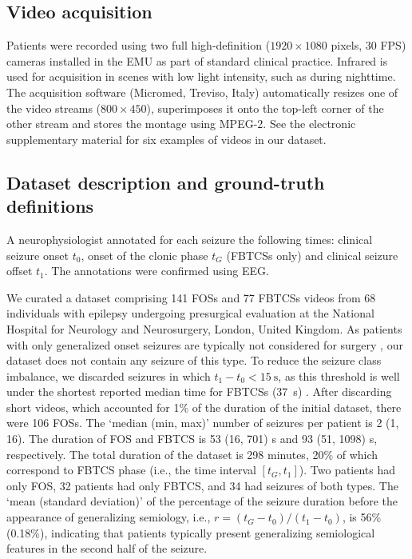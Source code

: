 \subsection{Video acquisition}

Patients were recorded using two full high-definition ($1920 \times 1080$ pixels, 30 \ac{FPS}) cameras installed in the \ac{EMU} as part of standard clinical practice.
Infrared is used for acquisition in scenes with low light intensity, such as during nighttime.
The acquisition software (Micromed, Treviso, Italy) automatically resizes one of the video streams ($800 \times 450$), superimposes it onto the top-left corner of the other stream and stores the montage using MPEG-2.
See the electronic supplementary material%
for six examples of videos in our dataset.


\subsection{Dataset description and ground-truth definitions}
\label{sec:dataset}

A neurophysiologist annotated for each seizure the following times: clinical seizure onset $t_0$, onset of the clonic phase $t_G$ (\acp{FBTCS} only) and clinical seizure offset $t_1$.
The annotations were confirmed using \ac{EEG}.

We curated a dataset comprising 141 \acp{FOS} and 77 \acp{FBTCS} videos from 68 individuals with epilepsy undergoing presurgical evaluation at the National Hospital for Neurology and Neurosurgery, London, United Kingdom.
As patients with only generalized onset seizures are typically not considered for surgery \cite{duncan_brain_2016}, our dataset does not contain any seizure of this type.  %
To reduce the seizure class imbalance, we discarded seizures in which $t_1 - t_0 < \SI{15}{\second}$, as this threshold is well under the shortest reported median time for \acp{FBTCS} (\SI{37}{\second}) \cite{jenssen_how_2006}.
After discarding short videos, which accounted for 1\% of the duration of the initial dataset, there were 106 \acp{FOS}.
The `median (min, max)' number of seizures per patient is 2 (1, 16).
The duration of \ac{FOS} and \ac{FBTCS} is 53 (16, 701) s and 93 (51, 1098) s, respectively.
The total duration of the dataset is 298 minutes, 20\% of which correspond to \ac{FBTCS} phase (i.e., the time interval $[t_G, t_1]$).
Two patients had only \ac{FOS}, 32 patients had only \ac{FBTCS}, and 34 had seizures of both types.
The `mean (standard deviation)' of the percentage of the seizure duration before the appearance of generalizing semiology, i.e., $r = (t_G - t_0) / (t_1 - t_0)$, is 56\% (0.18\%), indicating that patients typically present generalizing semiological features in the second half of the seizure.

